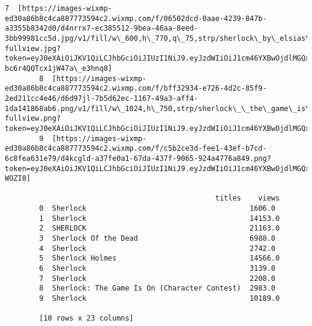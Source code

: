\documentclass[11pt]{article}
\begin{document}
\begin{Verbatim}[commandchars=\\\{\}]
        7  [https://images-wixmp-ed30a86b8c4ca887773594c2.wixmp.com/f/06502dcd-0aae-4239-847b-a3355b8342d0/d4nrrx7-ec385512-9bea-46aa-8eed-3bb99981cc5d.jpg/v1/fill/w\_600,h\_770,q\_75,strp/sherlock\_by\_elsias\_d4nrrx7-fullview.jpg?token=eyJ0eXAiOiJKV1QiLCJhbGciOiJIUzI1NiJ9.eyJzdWIiOiJ1cm46YXBwOjdlMGQxODg5ODIyNjQzNzNhNWYwZDQxNWVhMGQyNmUwIiwiaXNzIjoidXJuOmFwcDo3ZTBkMTg4OTgyMjY0MzczYTVmMGQ0MTVlYTBkMjZlMCIsIm9iaiI6W1t7ImhlaWdodCI6Ijw9NzcwIiwicGF0aCI6IlwvZlwvMDY1MDJkY2QtMGFhZS00MjM5LTg0N2ItYTMzNTViODM0MmQwXC9kNG5ycng3LWVjMzg1NTEyLTliZWEtNDZhYS04ZWVkLTNiYjk5OTgxY2M1ZC5qcGciLCJ3aWR0aCI6Ijw9NjAwIn1dXSwiYXVkIjpbInVybjpzZXJ2aWNlOmltYWdlLm9wZXJhdGlvbnMiXX0.MFrdMPlD0MCVREsbhl0-bc6r4QQTcx1jW47a\_e3hnq8]                                             
        8  [https://images-wixmp-ed30a86b8c4ca887773594c2.wixmp.com/f/bff32934-e726-4d2c-85f9-2ed211cc4e46/d6d97jl-7b5d62ec-1167-49a3-aff4-1da141868ab6.png/v1/fill/w\_1024,h\_750,strp/sherlock\_\_the\_game\_is\_on\_\_character\_contest\_\_by\_sherlockthegame\_d6d97jl-fullview.png?token=eyJ0eXAiOiJKV1QiLCJhbGciOiJIUzI1NiJ9.eyJzdWIiOiJ1cm46YXBwOjdlMGQxODg5ODIyNjQzNzNhNWYwZDQxNWVhMGQyNmUwIiwiaXNzIjoidXJuOmFwcDo3ZTBkMTg4OTgyMjY0MzczYTVmMGQ0MTVlYTBkMjZlMCIsIm9iaiI6W1t7ImhlaWdodCI6Ijw9NzUwIiwicGF0aCI6IlwvZlwvYmZmMzI5MzQtZTcyNi00ZDJjLTg1ZjktMmVkMjExY2M0ZTQ2XC9kNmQ5N2psLTdiNWQ2MmVjLTExNjctNDlhMy1hZmY0LTFkYTE0MTg2OGFiNi5wbmciLCJ3aWR0aCI6Ijw9MTAyNCJ9XV0sImF1ZCI6WyJ1cm46c2VydmljZTppbWFnZS5vcGVyYXRpb25zIl19.8FJFQbkoZhTxoISgGnPk7nl7lDh3lTbB5JU0qlZSD5c]   
        9  [https://images-wixmp-ed30a86b8c4ca887773594c2.wixmp.com/f/c5b2ce3d-fee1-43ef-b7cd-6c8fea631e79/d4kcgld-a37fe0a1-67da-437f-9065-924a4776a849.png?token=eyJ0eXAiOiJKV1QiLCJhbGciOiJIUzI1NiJ9.eyJzdWIiOiJ1cm46YXBwOjdlMGQxODg5ODIyNjQzNzNhNWYwZDQxNWVhMGQyNmUwIiwiaXNzIjoidXJuOmFwcDo3ZTBkMTg4OTgyMjY0MzczYTVmMGQ0MTVlYTBkMjZlMCIsIm9iaiI6W1t7InBhdGgiOiJcL2ZcL2M1YjJjZTNkLWZlZTEtNDNlZi1iN2NkLTZjOGZlYTYzMWU3OVwvZDRrY2dsZC1hMzdmZTBhMS02N2RhLTQzN2YtOTA2NS05MjRhNDc3NmE4NDkucG5nIn1dXSwiYXVkIjpbInVybjpzZXJ2aWNlOmZpbGUuZG93bmxvYWQiXX0.eqBpfLqmpgdZvMgTw11YDY6ul6pJZmsFWbydy-WOZI8]                                                                                                                                                                   
        
                                                 titles    views  
        0  Sherlock                                      1606.0   
        1  Sherlock                                      14153.0  
        2  SHERLOCK                                      21163.0  
        3  Sherlock Of the Dead                          6988.0   
        4  Sherlock                                      2742.0   
        5  Sherlock Holmes                               14566.0  
        6  Sherlock                                      3139.0   
        7  Sherlock                                      2208.0   
        8  Sherlock: The Game Is On (Character Contest)  2983.0   
        9  Sherlock                                      10189.0  
        
        [10 rows x 23 columns]
\end{Verbatim}
            
\end{document}

